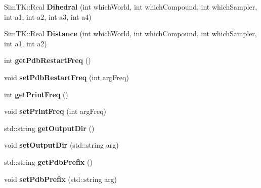 \begin{DoxyCompactItemize}
\item 
Sim\+T\+K\+::\+Real {\bfseries Dihedral} (int which\+World, int which\+Compound, int which\+Sampler, int a1, int a2, int a3, int a4)\hypertarget{classContext_a1710fe6a3895943a0f1b67b3e374448e}{}\label{classContext_a1710fe6a3895943a0f1b67b3e374448e}

\item 
Sim\+T\+K\+::\+Real {\bfseries Distance} (int which\+World, int which\+Compound, int which\+Sampler, int a1, int a2)\hypertarget{classContext_a5e84d653c0c10abe682f6fd739d8e1a8}{}\label{classContext_a5e84d653c0c10abe682f6fd739d8e1a8}

\item 
int {\bfseries get\+Pdb\+Restart\+Freq} ()\hypertarget{classContext_aca06e594d71dd502c5eef342894d18b8}{}\label{classContext_aca06e594d71dd502c5eef342894d18b8}

\item 
void {\bfseries set\+Pdb\+Restart\+Freq} (int arg\+Freq)\hypertarget{classContext_a4c23431f7c20df1f0199e81ad0893d53}{}\label{classContext_a4c23431f7c20df1f0199e81ad0893d53}

\item 
int {\bfseries get\+Print\+Freq} ()\hypertarget{classContext_a74dca08439407cba950f7ff9ef3e5aa3}{}\label{classContext_a74dca08439407cba950f7ff9ef3e5aa3}

\item 
void {\bfseries set\+Print\+Freq} (int arg\+Freq)\hypertarget{classContext_a095cb0c2c778d4aab2edb59e2f6974a7}{}\label{classContext_a095cb0c2c778d4aab2edb59e2f6974a7}

\item 
std\+::string {\bfseries get\+Output\+Dir} ()\hypertarget{classContext_a50b3d4f2dee2748f94348b24cc35685a}{}\label{classContext_a50b3d4f2dee2748f94348b24cc35685a}

\item 
void {\bfseries set\+Output\+Dir} (std\+::string arg)\hypertarget{classContext_a83f5d4d15f404cc6fc42a0a18fcdd493}{}\label{classContext_a83f5d4d15f404cc6fc42a0a18fcdd493}

\item 
std\+::string {\bfseries get\+Pdb\+Prefix} ()\hypertarget{classContext_ae424faf11e0bd79b2b992aa956922ac2}{}\label{classContext_ae424faf11e0bd79b2b992aa956922ac2}

\item 
void {\bfseries set\+Pdb\+Prefix} (std\+::string arg)\hypertarget{classContext_a286ce982ed1d6cd72c9deb0eea9aa5f8}{}\label{classContext_a286ce982ed1d6cd72c9deb0eea9aa5f8}

\end{DoxyCompactItemize}
